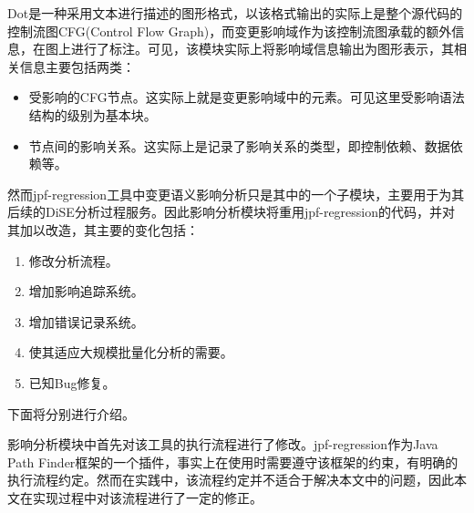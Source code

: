 Dot是一种采用文本进行描述的图形格式，以该格式输出的实际上是整个源代码的控制流图CFG(Control Flow Graph)，而变更影响域作为该控制流图承载的额外信息，在图上进行了标注。可见，该模块实际上将影响域信息输出为图形表示，其相关信息主要包括两类：
\begin{itemize}
	\item 受影响的CFG节点。这实际上就是变更影响域中的元素。可见这里受影响语法结构的级别为基本块。
	\item 节点间的影响关系。这实际上是记录了影响关系的类型，即控制依赖、数据依赖等。
\end{itemize}

%



然而jpf-regression工具中变更语义影响分析只是其中的一个子模块，主要用于为其后续的DiSE分析过程服务。因此影响分析模块将重用jpf-regression的代码，并对其加以改造，其主要的变化包括：
\begin{enumerate}
	\item 修改分析流程。
	\item 增加影响追踪系统。
	\item 增加错误记录系统。
	\item 使其适应大规模批量化分析的需要。
	\item 已知Bug修复。
\end{enumerate}

下面将分别进行介绍。

影响分析模块中首先对该工具的执行流程进行了修改。jpf-regression作为Java Path Finder框架的一个插件，事实上在使用时需要遵守该框架的约束，有明确的执行流程约定。然而在实践中，该流程约定并不适合于解决本文中的问题，因此本文在实现过程中对该流程进行了一定的修正。

